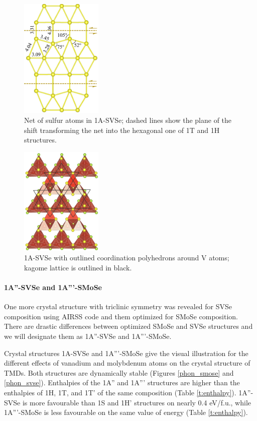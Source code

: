 \documentclass[a4paperm]{article}
\begin{document}
\begin{figure}
	\includegraphics[width=0.35\textwidth]{airss1v_s.png}
	\caption{Net of sulfur atoms in 1A-SVSe; dashed lines show the plane of the shift transforming the net into the hexagonal one of 1T and 1H structures.}
\label{airss1_s}
\end{figure}


\begin{figure}[H]
        \includegraphics[width=0.35\textwidth]{airss1_v_poly.png}
        \caption{1A-SVSe with outlined coordination polyhedrons around V atoms; kagome lattice is outlined in black.}
\label{airss1_poly}
\end{figure}




\paragraph{1A''-SVSe and 1A'''-SMoSe}
One more crystal structure with triclinic symmetry was revealed for SVSe composition using AIRSS code and them optimized for SMoSe composition.
There are drastic differences between optimized SMoSe and SVSe structures and we will designate them as 1A''-SVSe and 1A'''-SMoSe.

Crystal structures  1A-SVSe and 1A'''-SMoSe give the visual illustration for the different effects of vanadium and molybdenum atoms on the crystal structure of TMDs.
Both structures are dynamically stable (Figures \ref{phon_smose} and \ref{phon_svse}).
Enthalpies of the 1A'' and 1A''' structures are higher than the enthalpies of 1H, 1T, and 1T' of the same composition (Table \ref{t:enthalpy}).
1A''-SVSe is more favourable than 1S and 1H' structures on nearly 0.4 eV/f.u., while 1A'''-SMoSe is less favourable on the same value of energy (Table \ref{t:enthalpy}).
\end{document}
